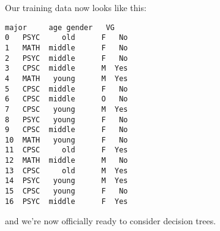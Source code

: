 Our training data now looks like this:

\begin{Verbatim}[fontsize=\small,samepage=true,frame=single,framesep=3mm,xleftmargin=4cm,xrightmargin=4cm]
   major     age gender   VG
0   PSYC     old      F   No
1   MATH  middle      F   No
2   PSYC  middle      F   No
3   CPSC  middle      M  Yes
4   MATH   young      M  Yes
5   CPSC  middle      F   No
6   CPSC  middle      O   No
7   CPSC   young      M  Yes
8   PSYC   young      F   No
9   CPSC  middle      F   No
10  MATH   young      F   No
11  CPSC     old      F  Yes
12  MATH  middle      M   No
13  CPSC     old      M  Yes
14  PSYC   young      M  Yes
15  CPSC   young      F   No
16  PSYC  middle      F  Yes
\end{Verbatim}

and we're now officially ready to consider decision trees.


%
%
